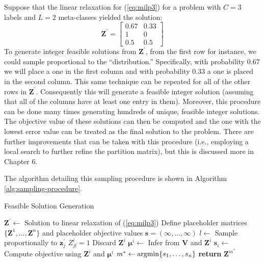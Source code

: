 \documentclass[../thesis.tex]{subfiles}
\begin{document}
Suppose that the linear relaxation for (\ref{eq:milp3}) for a problem with $C=3$
labels and $L=2$ meta-classes yielded the solution:
\begin{equation*}
    \mathbf{Z}^\prime =
    \begin{bmatrix}
        0.67 & 0.33 \\
        1 & 0 \\
        0.5 & 0.5
    \end{bmatrix}
\end{equation*}
To generate integer feasible solutions from $\mathbf{Z}^\prime$, from the first
row for instance, we could sample proportional to the ``distribution.''
Specifically, with probability $0.67$ we will place a one in the first column
and with probability $0.33$ a one is placed in the second column. This same
technique can be repeated for all of the other rows in $\mathbf{Z}^\prime$.
Consequently this will generate a feasible integer solution (assuming that all
of the columns have at least one entry in them). Moreover, this procedure can be
done many times generating hundreds of unique, feasible integer solutions. The
objective value of these solutions can then be computed and the one with the
lowest error value can be treated as the final solution to the problem. There
are further improvements that can be taken with this procedure (i.e., employing
a local search to further refine the partition matrix), but this is discussed
more in Chapter 6.

The algorithm detailing this sampling procedure is shown in Algorithm
\ref{alg:sampling-procedure}.
\begin{algorithm}
    \caption{Feasible Solution Generation}
    \label{alg:sampling-procedure}
    \begin{algorithmic}[1]
            \State $\mathbf{Z}^\prime \gets$ Solution to linear relaxation of (\ref{eq:milp3})
            \State Define placeholder matrices $\{\mathbf{Z}^1, \ldots,
            \mathbf{Z}^n\}$ and placeholder objective values $\mathbf{s} =
            (\infty, \ldots, \infty)$
                    \State $l \gets $ Sample proportionally to $\mathbf{z}_j^\prime$
                    \State $Z^i_{jl} = 1$
                \EndFor
                 
                    \State Discard $\mathbf{Z}^i$
                \Else{}
                    \State $\boldsymbol{\mu}^i \gets$ Infer from $\mathbf{V}$
                    and $\mathbf{Z}^i$
                    \State $\mathbf{s}_i \gets$ Compute objective using
                    $\mathbf{Z}^i$ and $\boldsymbol{\mu}^i$
                \EndIf
            \EndFor
            \State $m^* \gets \operatorname*{argmin} \{s_1, \ldots, s_n \}$
            \State \textbf{return} $\mathbf{Z}^{m^*}$
        \EndProcedure
    \end{algorithmic}
\end{algorithm}
\end{document}
